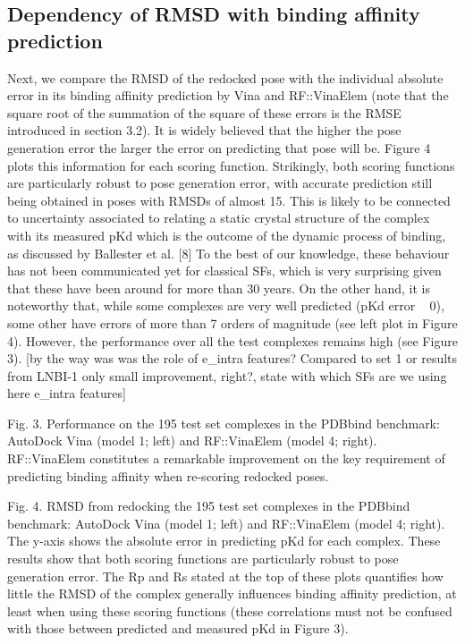 \documentclass[twocolumn]{bmcart}
\begin{document}
\subsection*{Dependency of RMSD with binding affinity prediction}

Next, we compare the RMSD of the redocked pose with the individual absolute error in its binding affinity prediction by Vina and RF::VinaElem (note that the square root of the summation of the square of these errors is the RMSE introduced in section 3.2). It is widely believed that the higher the pose generation error the larger the error on predicting that pose will be. Figure 4 plots this information for each scoring function. Strikingly, both scoring functions are particularly robust to pose generation error, with accurate prediction still being obtained in poses with RMSDs of almost 15. This is likely to be connected to uncertainty associated to relating a static crystal structure of the complex with its measured pKd which is the outcome of the dynamic process of binding, as discussed by Ballester et al. [8] To the best of our knowledge, these behaviour has not been communicated yet for classical SFs, which is very surprising given that these have been around for more than 30 years. On the other hand, it is noteworthy that, while some complexes are very well predicted (pKd error ~ 0), some other have errors of more than 7 orders of magnitude (see left plot in Figure 4). However, the performance over all the test complexes remains high (see Figure 3). [by the way was was the role of e\_intra features? Compared to set 1 or results from LNBI-1 only small improvement, right?, state with which SFs are we using here e\_intra features]

Fig. 3. Performance on the 195 test set complexes in the PDBbind benchmark: AutoDock Vina (model 1; left) and RF::VinaElem (model 4; right). RF::VinaElem constitutes a remarkable improvement on the key requirement of predicting binding affinity when re-scoring redocked poses.

Fig. 4. RMSD from redocking the 195 test set complexes in the PDBbind benchmark: AutoDock Vina (model 1; left) and RF::VinaElem (model 4; right). The y-axis shows the absolute error in predicting pKd for each complex. These results show that both scoring functions are particularly robust to pose generation error. The Rp and Rs stated at the top of these plots quantifies how little the RMSD of the complex generally influences binding affinity prediction, at least when using these scoring functions (these correlations must not be confused with those between predicted and measured pKd in Figure 3).
\end{document}
